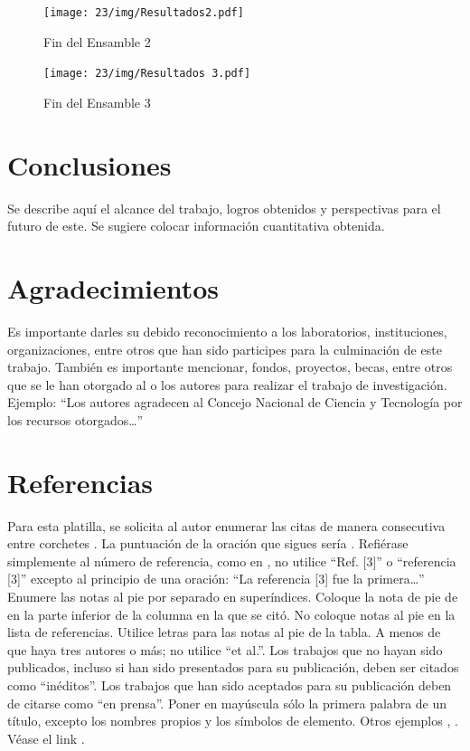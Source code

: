      \begin{figure}[H]
        \centering
        \texttt{[image: 23/img/Resultados2.pdf]}
        \caption{Fin del Ensamble 2}
        \label{fig:evi1}
    \end{figure}

    \begin{figure}[H]
        \centering
        \texttt{[image: 23/img/Resultados 3.pdf]}
        \caption{Fin del Ensamble 3}
        \label{fig:evi1}
    \end{figure}
    
    \section{Conclusiones}
    
    Se describe aquí el alcance del trabajo, logros obtenidos y perspectivas para el futuro de este. Se sugiere colocar información cuantitativa obtenida.
    
    \section{Agradecimientos}
    
    Es importante darles su debido reconocimiento a los laboratorios, instituciones, organizaciones, entre otros que han sido participes para la culminación de este trabajo. También es importante mencionar, fondos, proyectos, becas, entre otros que se le han otorgado al o los autores para realizar el trabajo de investigación. Ejemplo: “Los autores agradecen al Concejo Nacional de Ciencia y Tecnología por los recursos otorgados…”
    
    \section*{Referencias}
    
    Para esta platilla, se solicita al autor enumerar las citas de manera consecutiva entre corchetes \cite{YLi2013}. 
    La puntuación de la oración que sigues sería \cite{Mesaelides2011}. 
    Refiérase simplemente al número de referencia, como en \cite{Morales2012}, no utilice “Ref. [3]” o “referencia [3]” excepto al principio de una oración: “La referencia [3] fue la primera…”
    Enumere las notas al pie por separado en superíndices. Coloque la nota de pie de en la parte inferior de la columna en la que se citó. No coloque notas al pie en la lista de referencias. Utilice letras para las notas al pie de la tabla.
    A menos de que haya tres autores o más; no utilice “et al.”. Los trabajos que no hayan sido publicados, incluso si han sido presentados para su publicación, deben ser citados como “inéditos”. Los trabajos que han sido aceptados para su publicación deben de citarse como “en prensa”. Poner en mayúscula sólo la primera palabra de un título, excepto los nombres propios y los símbolos de elemento. 
    Otros ejemplos \cite{LAAngeles2021}, \cite{LAAngelesConni}. 
    Véase el link \cite{prueba}.
    
